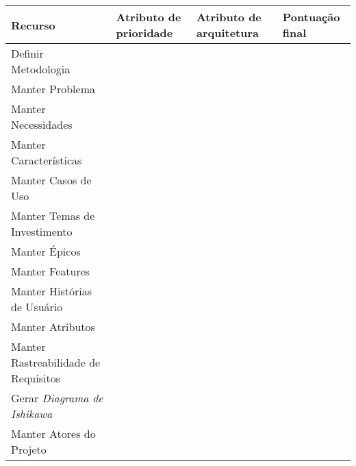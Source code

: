 \begin{table}[h]
\centering
\begin{tabular}{|p{3.5cm}|p{4cm}|p{4.5cm}|p{2cm}|}

\hline
\textbf{Recurso} &
\textbf{Atributo de prioridade} &
\textbf{Atributo de arquitetura} &
\textbf{Pontuação final}
\\ \hline

Definir Metodologia & 
 &
 &
 \\ \hline

Manter Problema &
 &
 &
 \\ \hline
 
Manter Necessidades &
 &
 &
 \\ \hline
 
Manter Características &
 &
 &
 \\ \hline
 
Manter Casos de Uso &
 &
 &
 \\ \hline
 
Manter Temas de Investimento &
 &
 &
 \\ \hline
 
Manter Épicos &
 &
 &
 \\ \hline
 
Manter Features &
 &
 &
 \\ \hline
 
Manter Histórias de Usuário &
 &
 &
 \\ \hline
 
Manter Atributos &
 &
 &
 \\ \hline
 
Manter Rastreabilidade de Requisitos &
 &
 &
 \\ \hline
 
Gerar \textit{Diagrama de Ishikawa} &
 &
 &
 \\ \hline
 
Manter Atores do Projeto &
 &
 &
 \\ \hline
 

\end{tabular}
\end{table}
